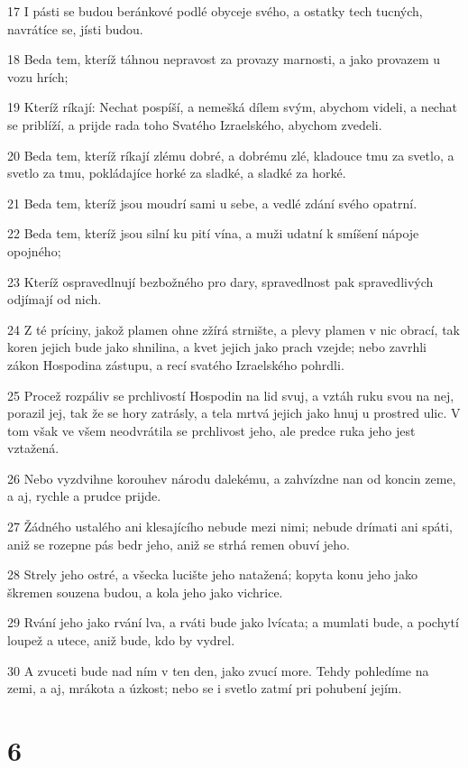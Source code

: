 \par 17 I pásti se budou beránkové podlé obyceje svého, a ostatky tech tucných, navrátíce se, jísti budou.
\par 18 Beda tem, kteríž táhnou nepravost za provazy marnosti, a jako provazem u vozu hrích;
\par 19 Kteríž ríkají: Nechat pospíší, a nemešká dílem svým, abychom videli, a nechat se priblíží, a prijde rada toho Svatého Izraelského, abychom zvedeli.
\par 20 Beda tem, kteríž ríkají zlému dobré, a dobrému zlé, kladouce tmu za svetlo, a svetlo za tmu, pokládajíce horké za sladké, a sladké za horké.
\par 21 Beda tem, kteríž jsou moudrí sami u sebe, a vedlé zdání svého opatrní.
\par 22 Beda tem, kteríž jsou silní ku pití vína, a muži udatní k smíšení nápoje opojného;
\par 23 Kteríž ospravedlnují bezbožného pro dary, spravedlnost pak spravedlivých odjímají od nich.
\par 24 Z té príciny, jakož plamen ohne zžírá strnište, a plevy plamen v nic obrací, tak koren jejich bude jako shnilina, a kvet jejich jako prach vzejde; nebo zavrhli zákon Hospodina zástupu, a recí svatého Izraelského pohrdli.
\par 25 Procež rozpáliv se prchlivostí Hospodin na lid svuj, a vztáh ruku svou na nej, porazil jej, tak že se hory zatrásly, a tela mrtvá jejich jako hnuj u prostred ulic. V tom však ve všem neodvrátila se prchlivost jeho, ale predce ruka jeho jest vztažená.
\par 26 Nebo vyzdvihne korouhev národu dalekému, a zahvízdne nan od koncin zeme, a aj, rychle a prudce prijde.
\par 27 Žádného ustalého ani klesajícího nebude mezi nimi; nebude drímati ani spáti, aniž se rozepne pás bedr jeho, aniž se strhá remen obuví jeho.
\par 28 Strely jeho ostré, a všecka lucište jeho natažená; kopyta konu jeho jako škremen souzena budou, a kola jeho jako vichrice.
\par 29 Rvání jeho jako rvání lva, a rváti bude jako lvícata; a mumlati bude, a pochytí loupež a utece, aniž bude, kdo by vydrel.
\par 30 A zvuceti bude nad ním v ten den, jako zvucí more. Tehdy pohledíme na zemi, a aj, mrákota a úzkost; nebo se i svetlo zatmí pri pohubení jejím.

\chapter{6}

